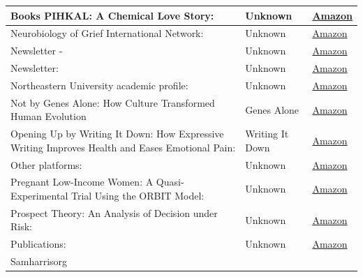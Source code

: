 \documentclass{article}
\begin{document}
\begin{longtable}{|p{8cm}|p{4cm}|p{2.5cm}|}
Books
PIHKAL: A Chemical Love Story: & Unknown & \href{https://amzn.to/45VdgfA}{Amazon} \\
\hline
Neurobiology of Grief International Network: & Unknown & \href{https://amzn.to/4dEUBJ8}{Amazon} \\
\hline
Newsletter - & Unknown & \href{https://amzn.to/3nMTaAs}{Amazon} \\
\hline
Newsletter: & Unknown & \href{https://amzn.to/4pPNWS3}{Amazon} \\
\hline
Northeastern University academic profile: & Unknown & \href{https://amzn.to/4njja27}{Amazon} \\
\hline
Not by Genes Alone: How Culture Transformed Human Evolution & Genes Alone & \href{https://amzn.to/3QirDEZ}{Amazon} \\
\hline
Opening Up by Writing It Down: How Expressive Writing Improves Health and Eases Emotional Pain: & Writing It Down & \href{https://amzn.to/47HrNMg}{Amazon} \\
\hline
Other platforms: & Unknown & \href{https://amzn.to/3PQfhBk}{Amazon} \\
\hline
Pregnant Low-Income Women: A Quasi-Experimental Trial Using the ORBIT Model: & Unknown & \href{https://amzn.to/3m2dHTa}{Amazon} \\
\hline
Prospect Theory: An Analysis of Decision under Risk: & Unknown & \href{https://amzn.to/3VWQTni}{Amazon} \\
\hline
Publications: & Unknown & \href{https://amzn.to/48mNhOE}{Amazon} \\
\hline
Samharrisorg


\end{longtable}
\end{document}
